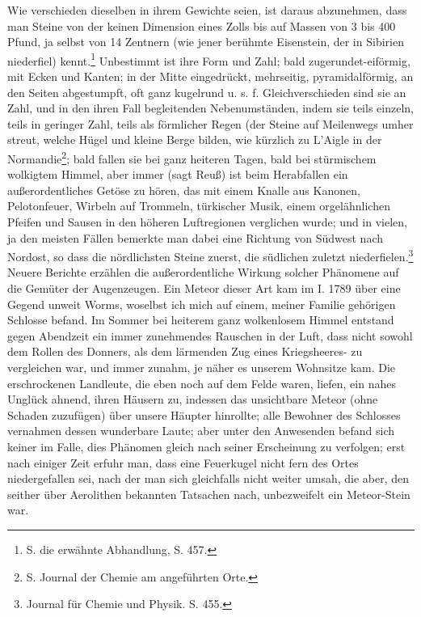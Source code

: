 \documentclass[a4paper, 11pt, oneside, polutonikogreek, german]{article}
\begin{document}
Wie verschieden dieselben in ihrem Gewichte seien, ist daraus abzunehmen, dass man Steine von der keinen Dimension eines Zolls bis auf Massen von 3 bis 400 Pfund, ja selbst von 14 Zentnern (wie jener berühmte Eisenstein, der in Sibirien niederfiel) kennt.\footnote{S. die erwähnte Abhandlung, S. 457.} Unbestimmt ist ihre Form und Zahl; bald zugerundet-eiförmig, mit Ecken und Kanten; in der Mitte eingedrückt, mehrseitig, pyramidalförmig, an den Seiten abgestumpft, oft ganz kugelrund u. s. f. Gleichverschieden sind sie an Zahl, und in den ihren Fall begleitenden Nebenumständen, indem sie teils einzeln, teils in geringer Zahl, teils als förmlicher Regen (der Steine auf Meilenwegs umher streut, welche Hügel und kleine Berge bilden, wie kürzlich zu L’Aigle in der Normandie\footnote{S. Journal der Chemie am angeführten Orte.}; bald fallen sie bei ganz heiteren Tagen, bald bei stürmischem wolkigtem Himmel, aber immer (sagt Reuß) ist beim Herabfallen ein außerordentliches Getöse zu hören, das mit einem Knalle aus Kanonen, Pelotonfeuer, Wirbeln auf Trommeln, türkischer Musik, einem orgelähnlichen Pfeifen und Sausen in den höheren Luftregionen verglichen wurde; und in vielen, ja den meisten Fällen bemerkte man dabei eine Richtung von Südwest nach Nordost, so dass die nördlichsten Steine zuerst, die südlichen zuletzt niederfielen.\footnote{Journal für Chemie und Physik. S. 455.} Neuere Berichte erzählen die außerordentliche Wirkung solcher Phänomene auf die Gemüter der Augenzeugen. Ein Meteor dieser Art kam im I. 1789 über eine Gegend unweit Worms, woselbst ich mich auf einem, meiner Familie gehörigen Schlosse befand. Im Sommer bei heiterem ganz wolkenlosem Himmel entstand gegen Abendzeit ein immer zunehmendes Rauschen in der Luft, dass nicht sowohl dem Rollen des Donners, als dem lärmenden Zug eines Kriegsheeres- zu vergleichen war, und immer zunahm, je näher es unserem Wohnsitze kam. Die erschrockenen Landleute, die eben noch auf dem Felde waren, liefen, ein nahes Unglück ahnend, ihren Häusern zu, indessen das unsichtbare Meteor (ohne Schaden zuzufügen) über unsere Häupter hinrollte; alle Bewohner des Schlosses vernahmen dessen wunderbare Laute; aber unter den Anwesenden befand sich keiner im Falle, dies Phänomen gleich nach seiner Erscheinung zu verfolgen; erst nach einiger Zeit erfuhr man, dass eine Feuerkugel nicht fern des Ortes niedergefallen sei, nach der man sich gleichfalls nicht weiter umsah, die aber, den seither über Aerolithen bekannten Tatsachen nach, unbezweifelt ein Meteor-Stein war.
\end{document}
